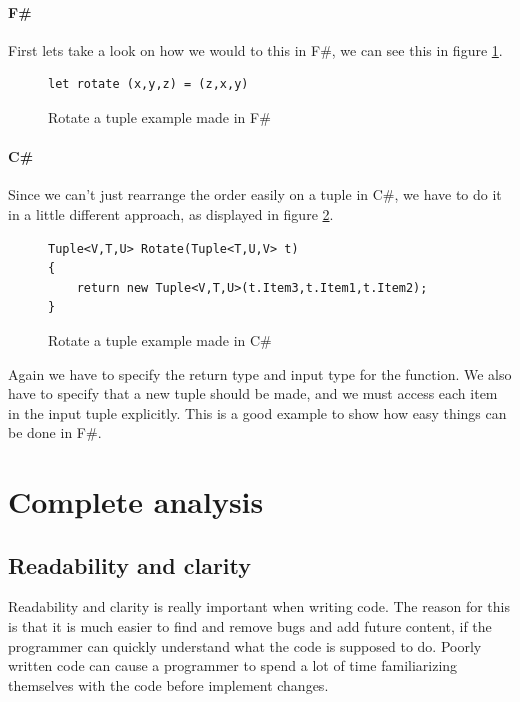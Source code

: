\documentclass[12pt, a4paper]{article}
\begin{document}
\paragraph{F\#} First lets take a look on how we would to this in F\#, we can see this in figure \ref{fig:RotateTupleFSharp}.

\begin{figure}[!h]
\begin{lstlisting}
let rotate (x,y,z) = (z,x,y)
\end{lstlisting}
\caption{Rotate a tuple example made in F\#}
\label{fig:RotateTupleFSharp}
\end{figure}

\paragraph{C\#} Since we can’t just rearrange the order easily on a tuple in C\#, we have to do it in a little different approach, as displayed in figure \ref{fig:RotateTupleCSharp}.

\begin{figure}[!h]
\begin{lstlisting}
Tuple<V,T,U> Rotate(Tuple<T,U,V> t) 
{ 
    return new Tuple<V,T,U>(t.Item3,t.Item1,t.Item2); 
}
\end{lstlisting}
\caption{Rotate a tuple example made in C\#}
\label{fig:RotateTupleCSharp}
\end{figure}

Again we have to specify the return type and input type for the function. We also have to specify that a new tuple should be made, and we must access each item in the input tuple explicitly. This is a good example to show how easy things can be done in F\#.

\newpage
\section{Complete analysis}

\subsection{Readability and clarity}
Readability and clarity is really important when writing code. The reason for this is that it is much easier to find and remove bugs and add future content, if the programmer can quickly understand what the code is supposed to do. Poorly written code can cause a programmer to spend a lot of time familiarizing themselves with the code before implement changes.\\
\end{document}

